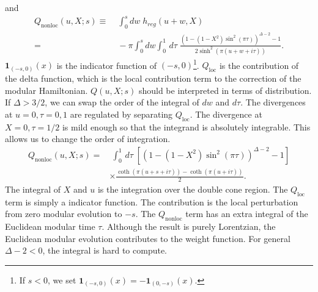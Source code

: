\documentclass[a4paper,11pt]{article}
\theoremstyle{definition}
\newcommand{\KL}[1]{\textcolor{brown}{#1}}
\begin{document}
and 
\begin{align}
    Q_{\text{nonloc}}(u,X;s) \equiv&\;\int_0^s dw \; h_{reg}(u+w,X) \nonumber\\
    =&\; -\pi\int_0^s dw\int_0^1 \, d\tau  \;\frac{\left(1 - (1-X^2)\sin^2(\pi \tau)\right)^{\Delta-2} -1}{2\sinh^2(\pi (u+w+i\tau))}.
\end{align}
$\textbf{1}_{(-s,0)}(x)$ is the indicator function of $(-s,0)$\footnote{If $s < 0$, we set $\textbf{1}_{(-s,0)}(x) = - \textbf{1}_{(0,-s)}(x)$.}. $Q_{\text{loc}}$ is the contribution of the delta function, which is the local contribution term to the correction of the modular Hamiltonian. $Q(u,X;s)$ should be interpreted in terms of distribution. If $\Delta > 3/2$, we can swap the order of the integral of $dw$ and $d\tau$. The divergences at $u = 0, \tau = 0 , 1$ are regulated by separating $Q_{\text{loc}}$. The divergence at $X=0, \tau = 1/2$ is mild enough so that the integrand is absolutely integrable. This allows us to change the order of integration. 
\begin{align}
    Q_{\text{nonloc}}(u,X;s) =&\; \int_0^1 \, d\tau \; \left[\left(1 - (1-X^2)\sin^2(\pi \tau)\right)^{\Delta-2} -1\right] \nonumber\\
    &\times\frac{\coth(\pi(u+s+i\tau)) - \coth(\pi(u+i\tau))}{2}.
\end{align}
The integral of $X$ and $u$ is the integration over the double cone region. The $Q_{\text{loc}}$ term is simply a indicator function. The contribution is the local perturbation from zero modular evolution to $-s$. The $Q_{\text{nonloc}}$ term has an extra integral of the Euclidean modular time $\tau$. Although the result is purely Lorentzian, the Euclidean modular evolution contributes to the weight function. For general $\Delta-2 < 0$, the integral is hard to compute.
\end{document}
